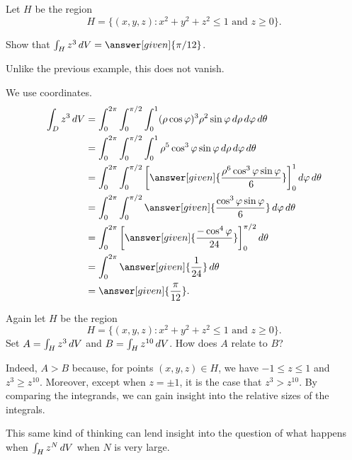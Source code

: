 \documentclass{ximera}
\begin{document}
\begin{example}
  Let $H$ be the region
  \[
  H = \{ (x,y,z) : x^2 + y^2 + z^2 \leq 1 \text{ and } z \geq 0 \}.
  \]

  Show that $\int_H z^3 \d V = \answer[given]{\pi/12}$.

  \begin{explanation}
    Unlike the previous example, this does not vanish.
    
    We use  coordinates.
    \begin{align*}
      \int_D z^3 \d V
      &= \int_{0}^{2\pi} \int_{0}^{\pi/2} \int_{0}^1 (\rho \cos \varphi)^3 \rho^2 \sin \varphi \d \rho \d \varphi \d \theta \\
      &= \int_{0}^{2\pi} \int_{0}^{\pi/2} \int_{0}^1 \rho^5 \cos^3 \varphi \sin \varphi \d \rho \d \varphi \d \theta \\
      &= \int_{0}^{2\pi} \int_{0}^{\pi/2} \eval{\answer[given]{\frac{\rho^6 \cos^3 \varphi \sin \varphi}{6}}}_0^1 \d \varphi \d \theta \\
      &= \int_{0}^{2\pi} \int_{0}^{\pi/2} \answer[given]{\frac{\cos^3 \varphi \sin \varphi}{6}} \d \varphi \d \theta \\
      &= \int_{0}^{2\pi} \eval{\answer[given]{\frac{-\cos^4 \varphi}{24}}}_{0}^{\pi/2} \d \theta \\
      &= \int_{0}^{2\pi} \answer[given]{\frac{1}{24}} \d \theta \\
      &= \answer[given]{\frac{\pi}{12}}.
    \end{align*}
  \end{explanation}
\end{example}

\begin{question}
  Again let $H$ be the region
  \[
  H = \{ (x,y,z): \text{$x^2 + y^2 +
    z^2 \leq 1$ and $z \geq 0 $}\}.
  \]
  Set $A = \int_H z^3 \mathop{}\!d V$ and $B = \int_H z^{10} \mathop{}\!d V$.  How does $A$ relate to $B$?

  \begin{multipleChoice}
  \end{multipleChoice}

  \begin{feedback}[correct]
    Indeed, $A > B$ because, for points $(x,y,z) \in H$, we have
    $-1 \leq z \leq 1$ and $z^3 \geq z^{10}$.  Moreover, except when
    $z = \pm 1$, it is the case that $z^3 > z^{10}$.  By comparing the
    integrands, we can gain insight into the relative sizes of the
    integrals.

    This same kind of thinking can lend insight into the question of
    what happens when $\int_H z^N \mathop{}\!d V$ when $N$ is very
    large.
  \end{feedback}
\end{question}
\end{document}
